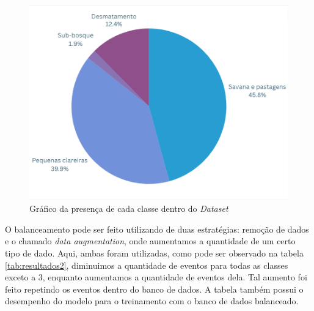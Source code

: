 \begin{figure}[H]
	\centering
	\begin{minipage}{0.98\linewidth}
		\centering
		\includegraphics[scale=0.6]{tg1/figuras/sem_balanceamento_pie.png}
		\caption{Gráfico da presença de cada classe dentro do \textit{Dataset}} \label{fig:lstm_sem_balanc}
	\end{minipage}
\end{figure}

O balanceamento pode ser feito utilizando de duas estratégias: remoção de dados e o chamado \textit{data augmentation}, onde aumentamos a quantidade de um certo tipo de dado. Aqui, ambas foram utilizadas, como pode ser observado na tabela \ref{tab:resultados2}, diminuimos a quantidade de eventos para todas as classes exceto a 3, enquanto aumentamos a quantidade de eventos dela. Tal aumento foi feito repetindo os eventos dentro do banco de dados. A tabela também possui o desempenho do modelo para o treinamento com o banco de dados balanceado.

